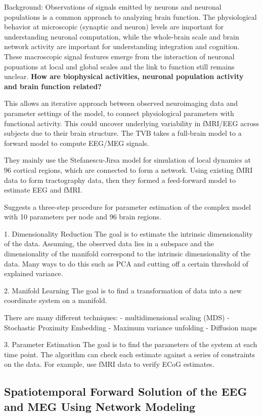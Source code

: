 \documentclass{article}
\begin{document}
Background: Observations of signals emitted by neurons and neuronal populations is a common approach to analyzing brain function. The physiological behavior at microscopic (synaptic and neuron) levels are important for understanding neuronal computation, while the whole-brain scale and brain network activity are important for understanding integration and cognition. These macroscopic signal features emerge from the interaction of neuronal popuations at local and global scales and the link to function still remains unclear. \textbf{How are biophysical activities, neuronal population activity and brain function related?} 

This allows an iterative approach between observed neuroimaging data and parameter settings of the model, to connect physiological parameters with functional activity. This could uncover underlying variability in fMRI/EEG across subjects due to their brain structure. The TVB takes a full-brain model to a forward model to compute EEG/MEG signals.

They mainly use the Stefanescu-Jirsa model for simulation of local dynamics at 96 cortical regions, which are connected to form a network. Using existing fMRI data to form tractography data, then they formed a feed-forward model to estimate EEG and fMRI.

Suggests a three-step procedure for parameter estimation of the complex model with 10 parameters per node and 96 brain regions. 

1. Dimensionality Reduction
The goal is to estimate the intrinsic dimensionality of the data. Assuming, the observed data lies in a subspace and the dimensionality of the manifold correspond to the intrinsic dimensionality of the data. Many ways to do this such as PCA and cutting off a certain threshold of explained variance.

2. Manifold Learning
The goal is to find a transformation of data into a new coordinate system on a manifold. 

There are many different techniques:
- multidimensional scaling (MDS)
- Stochastic Proximity Embedding
- Maximum variance unfolding 
- Diffusion maps

3. Parameter Estimation
The goal is to find the parameters of the system at each time point. The algorithm can check each estimate against a series of constraints on the data. For example, use fMRI data to verify ECoG estimates.

\subsection{Spatiotemporal Forward Solution of the EEG and MEG Using Network Modeling}
\cite{Jirsa2002}
\end{document}
